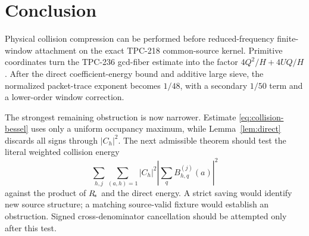 \section{Conclusion}

Physical collision compression can be performed before reduced-frequency finite-window
attachment on the exact TPC-218 common-source kernel.  Primitive coordinates turn the
TPC-236 gcd-fiber estimate into the factor
$4Q^2/H+4UQ/H$.  After the direct coefficient-energy bound and additive large sieve,
the normalized packet-trace exponent becomes $1/48$, with a secondary $1/50$ term and
a lower-order window correction.

The strongest remaining obstruction is now narrower.  Estimate
\eqref{eq:collision-bessel} uses only a uniform occupancy maximum, while
Lemma~\ref{lem:direct} discards all signs through $|C_h|^2$.  The next admissible
theorem should test the literal weighted collision energy
\[
 \sum_{h,j}\sum_{(a,h)=1}|C_h|^2
 \left|\sum_qB_{h,q}^{(j)}(a)\right|^2
\]
against the product of $R_{\!*}$ and the direct energy.  A strict saving would identify
new source structure; a matching source-valid fixture would establish an obstruction.
Signed cross-denominator cancellation should be attempted only after this test.
